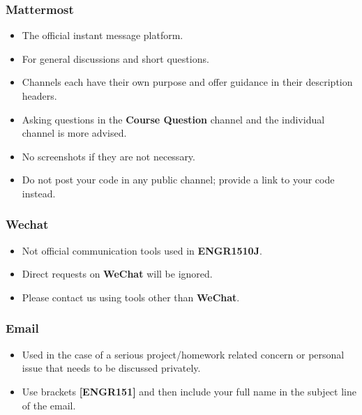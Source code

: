 \documentclass[
	11pt, %
]{beamer}
\begin{document}
\begin{frame}
	\frametitle{Mattermost}
 
	\begin{itemize}
    \item The official instant message platform.
    \item For general discussions and short questions.
    \item Channels each have their own purpose and offer guidance in their description headers.
    \item Asking questions in the \textbf{Course Question} channel and the individual channel is more advised.
    \item No screenshots if they are not necessary.
    \item Do not post your code in any public channel; provide a link to your code instead.
\end{itemize}

\end{frame}


\begin{frame}
	\frametitle{Wechat}
 
	\begin{itemize}
    \item Not official communication tools used in \textbf{ENGR1510J}.
    \item Direct requests on \textbf{WeChat} will be ignored.
    \item Please contact us using tools other than \textbf{WeChat}.
\end{itemize}

\end{frame}



\begin{frame}
	\frametitle{Email}
 
	\begin{itemize}
    \item Used in the case of a serious project/homework related concern or personal issue that needs to be discussed privately.
    \item Use brackets \textbf{[ENGR151]} and then include your full name in the subject line of the email.
\end{itemize}

\end{frame}


\end{document}
